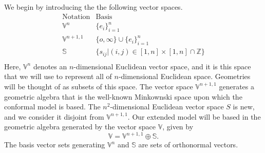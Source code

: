 \documentclass{birkjour}
\theoremstyle{definition}
\theoremstyle{remark}
\numberwithin{equation}{section}
\newcommand{\V}{\mathbb{V}}
\newcommand{\VS}{\mathbb{S}}
\newcommand{\nvao}{o}
\newcommand{\nvai}{\infty}
\begin{document}
We begin by introducing the the following vector spaces.
\begin{equation}
\begin{array}{ll}
\mbox{Notation} & \mbox{Basis} \\
\hline
\V^n & \{e_i\}_{i=1}^n \\
\V^{n+1,1} & \{\nvao,\nvai\}\cup\{e_i\}_{i=1}^n \\
\VS & \{s_{ij}|(i,j)\in[1,n]\times[1,n]\cap\mathbb{Z}\} \\
\end{array}
\end{equation}
Here, $\V^n$ denotes an $n$-dimensional Euclidean vector space, and it is this
space that we will use to represent all of $n$-dimensional Euclidean space.  Geometries
will be thought of as subsets of this space.  The vector space $\V^{n+1,1}$ generates
a geometric algebra that is the well-known Minkownski space upon which the conformal
model is based.  The $n^2$-dimensional Euclidean vector space $S$ is new, and we consider
it disjoint from $\V^{n+1,1}$.  Our extended model will be based in the geometric algebra
generated by the vector space $\V$, given by
\begin{equation}
\V=\V^{n+1,1}\oplus\VS.
\end{equation}
The basis vector sets generating $\V^n$ and $\VS$ are 
sets of orthonormal vectors.
\end{document}
